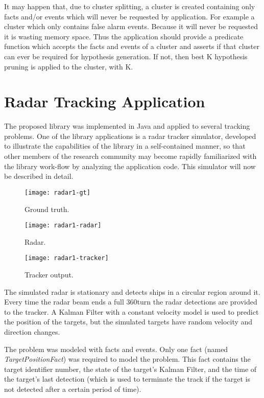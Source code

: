 It may happen that, due to cluster splitting, a cluster is created containing only facts and/or events which will never be requested by application. For example a cluster which only contains false alarm events. Because it will never be requested it is wasting memory space. Thus the application should provide a predicate function which accepts the facts and events of a cluster and asserts if that cluster can ever be required for hypothesis generation. If not, then best K hypothesis pruning is applied to the cluster, with K.

\section{Radar Tracking Application}
\label{sec:implementation}

The proposed library was implemented in Java and applied to several tracking problems. One of the library applications is a radar tracker simulator, developed to illustrate the capabilities of the library in a self-contained manner, so that other members of the research community may become rapidly familiarized with the library work-flow by analyzing the application code. This simulator will now be described in detail.

\ifx \ommitimages  \undefined
\begin{figure}
\begin{minipage}[b]{0.325\textwidth}
\centering
\texttt{[image: radar1-gt]}
\caption{Ground truth.}
\label{fig:radar-gt}
\end{minipage}
\begin{minipage}[b]{0.325\textwidth}
\centering
\texttt{[image: radar1-radar]}
\caption{Radar.}
\label{fig:radar-radar}
\end{minipage}
\begin{minipage}[b]{0.325\textwidth}
\centering
\texttt{[image: radar1-tracker]}
\caption{Tracker output.}
\label{fig:radar-tracker}
\end{minipage}
\end{figure}
\fi

The simulated radar is stationary and detects ships in a circular region around it. 
Every time the radar beam ends a full 360\degree turn the radar detections are provided to the tracker.
A Kalman Filter with a constant velocity model is used to predict the position of the targets, but the simulated targets have random velocity and direction changes.

The problem was modeled with facts and events. Only one fact (named \textit{TargetPositionFact}) was required to model the problem. This fact contains the target identifier number, the state of the target's Kalman Filter, and the time of the target's last detection (which is used to terminate the track if the target is not detected after a certain period of time).

